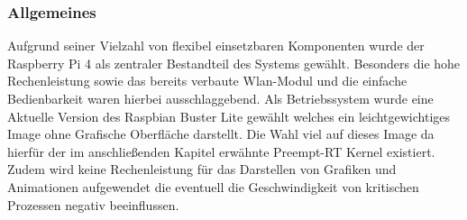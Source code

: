 \documentclass[12pt,a4paper,bibliography=totoc,listof=totoc]{scrartcl}
\begin{document}
\subsubsection{Allgemeines}
Aufgrund seiner Vielzahl von flexibel einsetzbaren Komponenten wurde der Raspberry Pi 4 als zentraler Bestandteil des Systems gewählt.
Besonders die hohe Rechenleistung sowie das bereits verbaute Wlan-Modul und die einfache Bedienbarkeit waren hierbei ausschlaggebend. 
Als Betriebssystem wurde eine Aktuelle Version des Raspbian Buster Lite gewählt welches ein leichtgewichtiges Image ohne Grafische Oberfläche darstellt.
Die Wahl viel auf dieses Image da hierfür der im anschließenden Kapitel erwähnte Preempt-RT Kernel existiert. Zudem wird keine Rechenleistung
für das Darstellen von Grafiken und Animationen aufgewendet die eventuell die Geschwindigkeit von kritischen Prozessen negativ beeinflussen.
\end{document}
